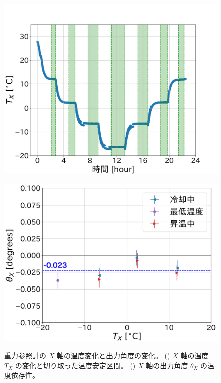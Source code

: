 \documentclass[../../main.tex]{subfiles}
\begin{document}
\begin{figure}[H]
    \begin{minipage}[b]{0.45\columnwidth}
        \centering
        \includegraphics[width=1.1\columnwidth]{tiltsensor/bath_tempX.png}
        \subcaption{}
        \label{fig:bath_tempX}
    \end{minipage}
    \hspace{0.005\columnwidth}
    \begin{minipage}[b]{0.45\columnwidth}
        \centering
        \includegraphics[width=1.065\columnwidth]{tiltsensor/angleX_temp_dep.pdf}
        \subcaption{}
        \label{fig:angleX_temp_dep}
    \end{minipage}
    \caption{重力参照計の $X$ 軸の温度変化と出力角度の変化。
             () $X$ 軸の温度 $T_{X}$ の変化と切り取った温度安定区間。
             () $X$ 軸の出力角度 $\theta_{X}$ の温度依存性。}
    \label{fig:evaluation_bath_Xaxis}
\end{figure}
\end{document}

